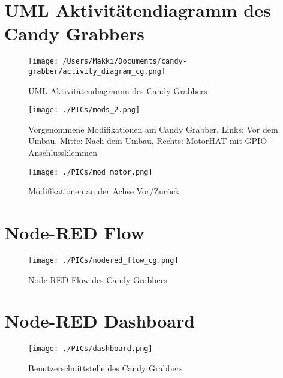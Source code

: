 \documentclass[BMR,Bachelor,ngerman]{twbook}%
\begin{document}
\chapter{UML Aktivitätendiagramm des Candy Grabbers}
\begin{figure}[H]
\centering
\texttt{[image: /Users/Makki/Documents/candy-grabber/activity\_diagram\_cg.png]}
\caption{UML Aktivitätendiagramm des Candy Grabbers}\label{fig:uml_activity}
\end{figure}
%
\begin{figure}[H]
\centering
\texttt{[image: ./PICs/mods\_2.png]}
\caption{Vorgenommene Modifikationen am Candy Grabber. Links: Vor dem Umbau, Mitte: Nach dem Umbau, Rechts: MotorHAT mit GPIO-Anschlussklemmen}\label{fig:modifications}
\end{figure}
\begin{figure}[H]
\centering
\texttt{[image: ./PICs/mod\_motor.png]}
\caption{Modifikationen an der Achse Vor/Zurück}\label{fig:mod_motor}
\end{figure}
%
\chapter{Node-RED Flow}
\begin{figure}[H]
\centering
\texttt{[image: ./PICs/nodered\_flow\_cg.png]}
\caption{Node-RED Flow des Candy Grabbers}\label{fig:nodered_flow}
\end{figure}
%
\chapter{Node-RED Dashboard}
\begin{figure}[H]
\centering
\texttt{[image: ./PICs/dashboard.png]}
\caption{Benutzerschnittstelle des Candy Grabbers}\label{fig:dash}
\end{figure}
%
%
% 
% 
% 
\end{document}
